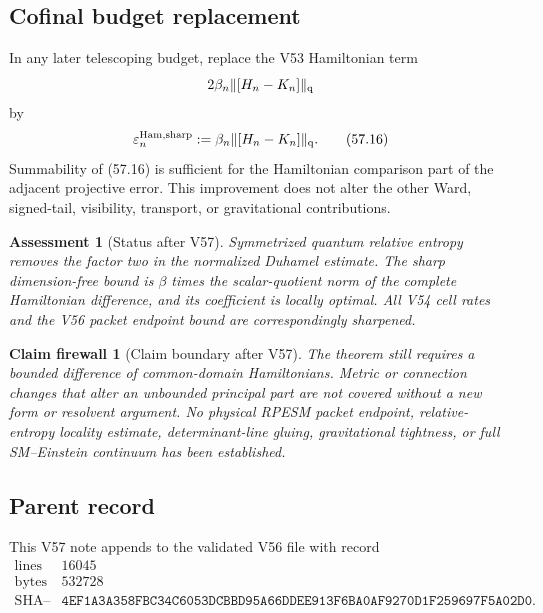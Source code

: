 \documentclass[11pt]{article}
\newtheorem{firewall}[theorem]{Claim firewall}
\newtheorem{assessment}[theorem]{Assessment}
\theoremstyle{remark}
\begin{document}
\subsection{Cofinal budget replacement}

In any later telescoping budget, replace the V53 Hamiltonian term
\[
 2\beta_n\|[H_n-K_n]\|_{\rm q}
\]
by
\begin{equation}
 \varepsilon_n^{\rm Ham,sharp}
 :=
 \beta_n\|[H_n-K_n]\|_{\rm q}.                    \tag{57.16}
\end{equation}
Summability of (57.16) is sufficient for the Hamiltonian comparison
part of the adjacent projective error.  This improvement does not
alter the other Ward, signed-tail, visibility, transport, or
gravitational contributions.

\begin{assessment}[Status after V57]
\label{ass:v12v57-status}
Symmetrized quantum relative entropy removes the factor two in the
normalized Duhamel estimate.  The sharp dimension-free bound is
\(\beta\) times the scalar-quotient norm of the complete Hamiltonian
difference, and its coefficient is locally optimal.  All V54 cell
rates and the V56 packet endpoint bound are correspondingly
sharpened.
\end{assessment}

\begin{firewall}[Claim boundary after V57]
\label{fire:v12v57-claim}
The theorem still requires a bounded difference of common-domain
Hamiltonians.  Metric or connection changes that alter an unbounded
principal part are not covered without a new form or resolvent
argument.  No physical RPESM packet endpoint, relative-entropy
locality estimate, determinant-line gluing, gravitational
tightness, or full SM--Einstein continuum has been established.
\end{firewall}

\subsection{Parent record}

This V57 note appends to the validated V56 file with record
\[
\begin{array}{c|c}
\text{lines}&16045\\
\text{bytes}&532728\\
\text{SHA--256}&
\texttt{4EF1A3A358FBC34C6053DCBBD95A66DDEE913F6BA0AF9270D1F259697F5A02D0}.
\end{array}
\]
\end{document}
